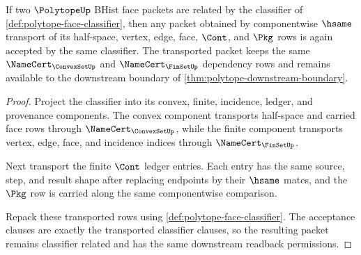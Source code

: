 \begin{theorem}
\label{thm:polytope-face-classifier-transport}
If two $\PolytopeUp$ BHist face packets are related by the classifier of
\autoref{def:polytope-face-classifier}, then any packet obtained by
componentwise $\hsame$ transport of its half-space, vertex, edge, face,
$\Cont$, and $\Pkg$ rows is again accepted by the same classifier. The
transported packet keeps the same $\NameCert_{\ConvexSetUp}$ and
$\NameCert_{\FinSetUp}$ dependency rows and remains available to the downstream
boundary of \autoref{thm:polytope-downstream-boundary}.
\end{theorem}
\begin{proof}
Project the classifier into its convex, finite, incidence, ledger, and
provenance components. The convex component transports half-space and carried
face rows through $\NameCert_{\ConvexSetUp}$, while the finite component
transports vertex, edge, face, and incidence indices through
$\NameCert_{\FinSetUp}$.

Next transport the finite $\Cont$ ledger entries. Each entry has the same
source, step, and result shape after replacing endpoints by their $\hsame$
mates, and the $\Pkg$ row is carried along the same componentwise comparison.

Repack these transported rows using
\autoref{def:polytope-face-classifier}. The acceptance clauses are exactly the
transported classifier clauses, so the resulting packet remains classifier
related and has the same downstream readback permissions.
\end{proof}


